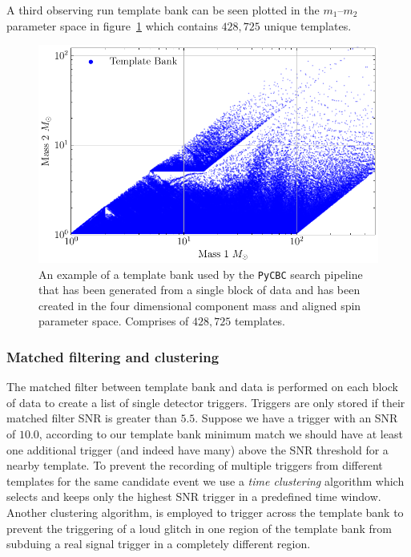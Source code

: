 A third observing run template bank can be seen plotted in the $m_{1}\text{--}m_{2}$ parameter space in figure~\ref{2:fig:pycbc-o3-template-bank} which contains $428,725$ unique templates.
%
\begin{figure}
    \centering
    \includegraphics[width=0.75\linewidth]{images/2_searches/H1L1V1-PLOT_BANK.pdf}
    \caption{An example of a template bank used by the \texttt{PyCBC} search pipeline that has been generated from a single block of data and has been created in the four dimensional component mass and aligned spin parameter space. Comprises of $428,725$ templates.}
    \label{2:fig:pycbc-o3-template-bank}
\end{figure}
%






\subsubsection{Matched filtering and clustering}

The matched filter between template bank and data is performed on each block of data to create a list of single detector triggers. Triggers are only stored if their matched filter SNR is greater than $5.5$. Suppose we have a trigger with an SNR of $10.0$, according to our template bank minimum match we should have at least one additional trigger (and indeed have many) above the SNR threshold for a nearby template. To prevent the recording of multiple triggers from different templates for the same candidate event we use a \textit{time clustering} algorithm which selects and keeps only the highest SNR trigger in a predefined time window. Another clustering algorithm, is employed to trigger across the template bank to prevent the triggering of a loud glitch in one region of the template bank from subduing a real signal trigger in a completely different region.


